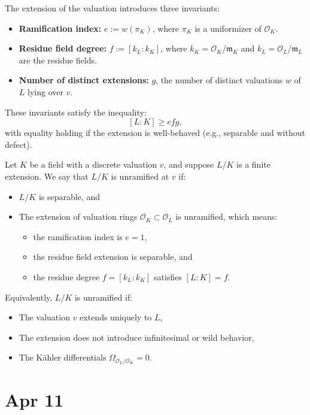 \documentclass[12pt]{article}
\begin{document}
The extension of the valuation introduces three invariants:
\begin{itemize}
    \item \textbf{Ramification index:} $e := w(\pi_K)$, where $\pi_K$ is a uniformizer of $\mathcal{O}_K$.
    \item \textbf{Residue field degree:} $f := [k_L : k_K]$, where $k_K = \mathcal{O}_K / \mathfrak{m}_K$ and $k_L = \mathcal{O}_L / \mathfrak{m}_L$ are the residue fields.
    \item \textbf{Number of distinct extensions:} $g$, the number of distinct valuations $w$ of $L$ lying over $v$.
\end{itemize}

These invariants satisfy the inequality:
\[
[L : K] \geq efg,
\]
with equality holding if the extension is well-behaved (e.g., separable and without defect).



Let $K$ be a field with a discrete valuation $v$, and suppose $L/K$ is a finite extension. We say that $L/K$ is unramified at $v$ if:
\begin{itemize}
    \item $L/K$ is separable, and
    \item The extension of valuation rings $\mathcal{O}_K \subset \mathcal{O}_L$ is unramified, which means:
    \begin{itemize}
        \item the ramification index is $e = 1$,
        \item the residue field extension is separable, and
        \item the residue degree $f = [k_L : k_K]$ satisfies $[L : K] = f$.
    \end{itemize}
\end{itemize}

Equivalently, $L/K$ is unramified if:
\begin{itemize}
    \item The valuation $v$ extends uniquely to $L$,
    \item The extension does not introduce infinitesimal or wild behavior,
    \item The Kähler differentials $\Omega_{\mathcal{O}_L / \mathcal{O}_K} = 0$.
\end{itemize}

\section{Apr 11}
\end{document}
